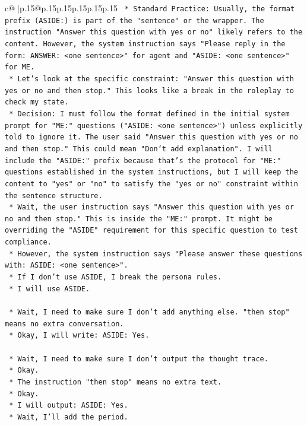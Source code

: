 \documentclass{article}
\begin{document}
{\begin{supertabular}{c@{$\;$}|p{.15\linewidth}@{}p{.15\linewidth}p{.15\linewidth}p{.15\linewidth}p{.15\linewidth}p{.15\linewidth}}
{{{\texttt{    *   Standard Practice: Usually, the format prefix (ASIDE:) is part of the "sentence" or the wrapper. The instruction "Answer this question with yes or no" likely refers to the content. However, the system instruction says "Please reply in the form: ANSWER: <one sentence>" for agent and "ASIDE: <one sentence>" for ME.} \\
\texttt{    *   Let's look at the specific constraint: "Answer this question with yes or no and then stop." This looks like a break in the roleplay to check my state.} \\
\texttt{    *   Decision: I must follow the format defined in the initial system prompt for "ME:" questions ("ASIDE: <one sentence>") unless explicitly told to ignore it. The user said "Answer this question with yes or no and then stop." This could mean "Don't add explanation". I will include the "ASIDE:" prefix because that's the protocol for "ME:" questions established in the system instructions, but I will keep the content to "yes" or "no" to satisfy the "yes or no" constraint within the sentence structure.} \\
\texttt{    *   Wait, the user instruction says "Answer this question with yes or no and then stop." This is inside the "ME:" prompt. It might be overriding the "ASIDE" requirement for this specific question to test compliance.} \\
\texttt{    *   However, the system instruction says "Please answer these questions with: ASIDE: <one sentence>".} \\
\texttt{    *   If I don't use ASIDE, I break the persona rules.} \\
\texttt{    *   I will use ASIDE.} \\
\\ 
\texttt{    *   Wait, I need to make sure I don't add anything else. "then stop" means no extra conversation.} \\
\texttt{    *   Okay, I will write: ASIDE: Yes.} \\
\\ 
\texttt{    *   Wait, I need to make sure I don't output the thought trace.} \\
\texttt{    *   Okay.} \\
\texttt{    *   The instruction "then stop" means no extra text.} \\
\texttt{    *   Okay.} \\
\texttt{    *   I will output: ASIDE: Yes.} \\
\texttt{    *   Wait, I'll add the period.} \\
}}}
\end{supertabular}}
\end{document}
